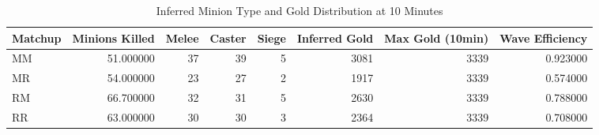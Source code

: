 \begin{table}
\caption{Inferred Minion Type and Gold Distribution at 10 Minutes}
\label{tab:minion_gold_table}
\begin{tabular}{lrrrrrrr}
\toprule
Matchup & Minions Killed & Melee & Caster & Siege & Inferred Gold & Max Gold (10min) & Wave Efficiency \\
\midrule
MM & 51.000000 & 37 & 39 & 5 & 3081 & 3339 & 0.923000 \\
MR & 54.000000 & 23 & 27 & 2 & 1917 & 3339 & 0.574000 \\
RM & 66.700000 & 32 & 31 & 5 & 2630 & 3339 & 0.788000 \\
RR & 63.000000 & 30 & 30 & 3 & 2364 & 3339 & 0.708000 \\
\bottomrule
\end{tabular}
\end{table}
